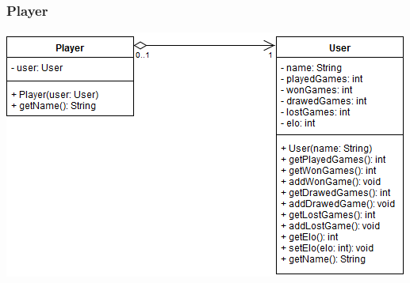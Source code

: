 \documentclass[parskip=full]{scrartcl}
\begin{document}
		\subsubsection{Player}
		\begin{minipage}{\linewidth}
			\centering
			\includegraphics[width=1\linewidth]{Diagramme/Player}
			\label{fig:player}
		\end{minipage}
\end{document}
